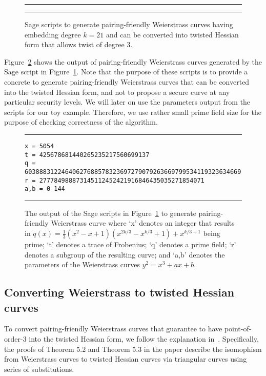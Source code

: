 %
\begin{figure}
\hrule\medskip
{}
\hrule
\caption{Sage scripts to generate pairing-friendly Weierstrass curves having embedding degree $k = 21$
and can be converted into twisted Hessian form that allows twist of degree 3.}
\label{fig:sscript}
\end{figure}

Figure~\ref{fig:sout} shows the output of
pairing-friendly Weierstrass curves generated by the Sage script in Figure~\ref{fig:sscript}.
Note that the purpose of these scripts is to provide a concrete to generate
pairing-friendly Weierstrass curves that can be converted into the twisted Hessian form,
and not to propose a secure curve at any particular security levels.
We will later on use the parameters output from the scripts for our toy example.
Therefore, we use rather small prime field size for the purpose of checking correctness of the algorithm.

\begin{figure}
\hrule\medskip
{\scriptsize
\begin{verbatim}
x = 5054
t = 425678681440265235217560699137
q = 60388831224640627688578323697279079263669799534119323634669
r = 277784988873145112452421916846435035271854071
a,b = 0 144
\end{verbatim}
}
\hrule
\caption{The output of the Sage scripts in Figure~\ref{fig:sscript}
to generate pairing-friendly Weierstrass curve where
`x' denotes an integer that results in $q(x) = \frac{1}{3} (x^2 - x + 1) (x^{2k/3} - x^{k/3} + 1) + x^{k/3+1}$ being prime;
`t' denotes a trace of Frobenius;
`q' denotes a prime field;
`r' denotes a subgroup of the resulting curve; and
`a,b' denotes the parameters of the Weierstrass curves $y^2 = x^3 + ax + b$.
}
\label{fig:sout}
\end{figure}



\subsection{Converting Weierstrass to twisted Hessian curves}
\label{subsec:w2h}

To convert pairing-friendly Weierstrass curves that guarantee to have point-of-order-3
into the twisted Hessian form, we follow the explanation in~\cite{2015/hessian}.
Specifically, the proofs of Theorem 5.2 and {Theorem 5.3} in the paper describe the isomophism from
Weierstrass curves to twisted Hessian curves via triangular curves using series of substitutions.

